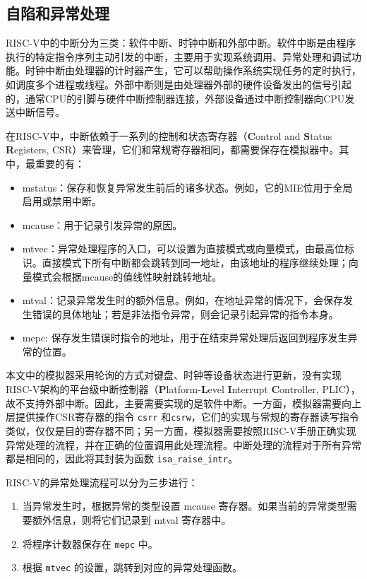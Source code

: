 \subsection{自陷和异常处理}

RISC-V中的中断分为三类：软件中断、时钟中断和外部中断。软件中断是由程序执行的特定指令序列主动引发的中断，主要用于实现系统调用、异常处理和调试功能。时钟中断由处理器的计时器产生，它可以帮助操作系统实现任务的定时执行，如调度多个进程或线程。外部中断则是由处理器外部的硬件设备发出的信号引起的，通常CPU的引脚与硬件中断控制器连接，外部设备通过中断控制器向CPU发送中断信号。

在RISC-V中，中断依赖于一系列的控制和状态寄存器（\textbf{C}ontrol and \textbf{S}tatus \textbf{R}egisters, CSR）来管理，它们和常规寄存器相同，都需要保存在模拟器中。其中，最重要的有：
\begin{itemize}
    \item mstatus：保存和恢复异常发生前后的诸多状态。例如，它的MIE位用于全局启用或禁用中断。
    \item mcause：用于记录引发异常的原因。
    \item mtvec：异常处理程序的入口，可以设置为直接模式或向量模式，由最高位标识。直接模式下所有中断都会跳转到同一地址，由该地址的程序继续处理；向量模式会根据mcause的值线性映射跳转地址。
    \item mtval：记录异常发生时的额外信息。例如，在地址异常的情况下，会保存发生错误的具体地址；若是非法指令异常，则会记录引起异常的指令本身。
    \item mepc: 保存发生错误时指令的地址，用于在结束异常处理后返回到程序发生异常的位置。
\end{itemize}

本文中的模拟器采用轮询的方式对键盘、时钟等设备状态进行更新，没有实现RISC-V架构的平台级中断控制器（\textbf{P}latform-\textbf{L}evel \textbf{I}nterrupt \textbf{C}ontroller, PLIC），故不支持外部中断。因此，主要需要实现的是软件中断。一方面，模拟器需要向上层提供操作CSR寄存器的指令 \lstinline{csrr} 和\lstinline{csrw}，它们的实现与常规的寄存器读写指令类似，仅仅是目的寄存器不同；另一方面，模拟器需要按照RISC-V手册\cite{watermanRISCVInstructionSet2011}正确实现异常处理的流程，并在正确的位置调用此处理流程。中断处理的流程对于所有异常都是相同的，因此将其封装为函数 \lstinline{isa_raise_intr}。

RISC-V的异常处理流程可以分为三步进行：

\begin{enumerate}
    \item 当异常发生时，根据异常的类型设置 mcause 寄存器。如果当前的异常类型需要额外信息，则将它们记录到 mtval 寄存器中。
    \item 将程序计数器保存在 \lstinline{mepc} 中。
    \item 根据 \lstinline{mtvec} 的设置，跳转到对应的异常处理函数。
\end{enumerate}

